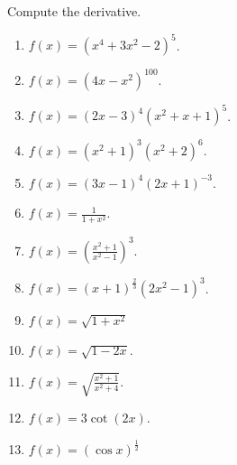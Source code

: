 Compute the derivative.
\begin{multicols}{2}
\begin{enumerate}[ref={\fcProblemRef}]
\item $\displaystyle f(x)= (x^4+3x^2-2)^5$.

\item $\displaystyle f(x)= (4x-x^2)^{100}$.

\item $\displaystyle f(x)= (2x - 3)^4 (x^2 + x + 1)^5$.

\item $\displaystyle f(x)= (x^2+1)^3(x^2+2)^6$.

\item $\displaystyle f(x)= (3x-1)^4(2x+1)^{-3}$.

\item $\displaystyle f(x)=\frac{1}{1+x^2} $.

\item $\displaystyle f(x)=\left(\frac{x^2+1}{x^2-1} \right)^3 $.

\item $\displaystyle f(x)= (x+1)^{\frac{2}{3}}(2x^2-1)^3$.

\item   $\displaystyle f(x)=\sqrt{1+x^2}$

\item $\displaystyle f(x)= \sqrt{1-2x}$.

\item $\displaystyle f(x)= \sqrt{\frac{x^2+1}{x^2+4}}$.

\item $\displaystyle f(x)= 3\cot (2x)$.

\item \label{problemd/dx(cos(x))^(1/2)}  $\displaystyle f(x)=(\cos x)^{\frac{1}{ 2}}$


\end{enumerate}
\end{multicols}
